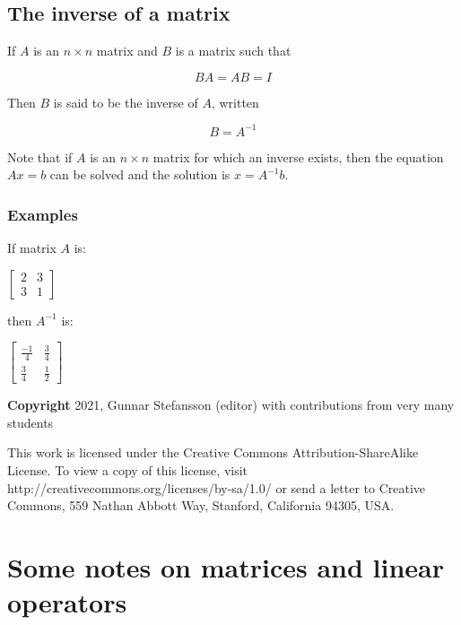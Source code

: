 \documentclass[12pt,a4paper]{article}
\theoremstyle{regla}
\theoremstyle{remark}
\theoremstyle{definition}
\theoremstyle{nonumberbreak}
\begin{document}
\subsection{The inverse of a matrix}
\begin{fbox}
\begin{minipage}{0.97\textwidth}
If $A$ is an $n \times n$ matrix and $B$ is a matrix such that

$$ BA = AB = I$$

Then $B$ is said to be the inverse of $A$, written 

$$ B = A ^{-1} $$

Note that if $A$ is an $n \times n$ matrix for which an inverse exists, then the equation $Ax = b$ can be solved and the solution is $x = A^{-1} b$.

\end{minipage}
\end{fbox}
\subsubsection{Examples}
\begin{xmpl}

If matrix $A$ is:

$\begin{bmatrix}
2 & 3  \\
3 & 1 
\end{bmatrix}$

then $A ^{-1}$ is:

$\begin{bmatrix}
\frac{-1}{4} & \frac{3}{4}  \\
\frac{3}{4} & \frac{1}{2} 
\end{bmatrix}$
\end{xmpl}

{\bf Copyright}
2021, Gunnar Stefansson (editor) with contributions from very many students

This work is licensed under the Creative Commons
Attribution-ShareAlike License. To view a copy of this license, visit
http://creativecommons.org/licenses/by-sa/1.0/ or send a letter to
Creative Commons, 559 Nathan Abbott Way, Stanford, California 94305,
USA.
\clearpage
\section{Some notes on matrices and linear operators}
\end{document}
